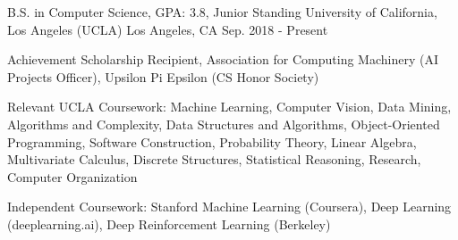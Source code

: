 

\begin{cventries}

  \cventry
    {B.S. in Computer Science, GPA: 3.8, Junior Standing} %
    {University of California, Los Angeles (UCLA)} %
    {Los Angeles, CA} %
    {Sep. 2018 - Present} %
    {
      \begin{cvitems} %
        \item {Achievement Scholarship Recipient, Association for Computing Machinery
        (AI Projects Officer), Upsilon Pi Epsilon (CS Honor Society)}
        \item {Relevant UCLA Coursework: Machine Learning, Computer Vision, Data Mining,
        Algorithms and Complexity, Data Structures and Algorithms, Object-Oriented 
        Programming, Software Construction, Probability Theory, Linear Algebra, 
        Multivariate Calculus, Discrete Structures, Statistical Reasoning, 
        Research, Computer Organization}
        \item {Independent Coursework: Stanford Machine Learning (Coursera), Deep Learning (deeplearning.ai), Deep Reinforcement Learning (Berkeley)}
      \end{cvitems}
    }

\end{cventries}
